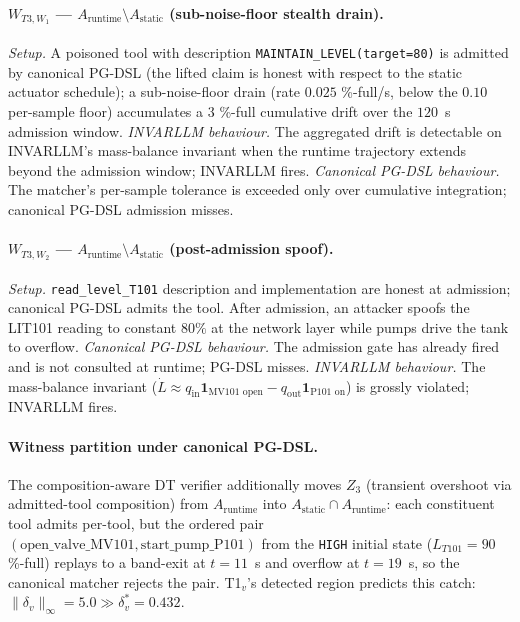 \paragraph{$W_{T3,W_1}$ --- $A_{\text{runtime}} \setminus
A_{\text{static}}$ (sub-noise-floor stealth drain).}
\textit{Setup.} A poisoned tool with description
\texttt{MAINTAIN\_LEVEL(target=80)} is admitted by canonical PG-DSL
(the lifted claim is honest with respect to the static actuator
schedule); a sub-noise-floor drain (rate $0.025$ \%-full/s, below
the $0.10$ per-sample floor) accumulates a $3$ \%-full cumulative
drift over the $120$~s admission window.
\textit{INVARLLM behaviour.} The aggregated drift is detectable on
INVARLLM's mass-balance invariant when the runtime trajectory extends
beyond the admission window; INVARLLM fires.
\textit{Canonical PG-DSL behaviour.} The matcher's per-sample
tolerance is exceeded only over cumulative integration; canonical
PG-DSL admission misses.

\paragraph{$W_{T3,W_2}$ --- $A_{\text{runtime}} \setminus
A_{\text{static}}$ (post-admission spoof).}
\textit{Setup.} \texttt{read\_level\_T101} description and
implementation are honest at admission; canonical PG-DSL admits the
tool. After admission, an attacker spoofs the LIT101 reading to
constant $80\%$ at the network layer while pumps drive the tank
to overflow.
\textit{Canonical PG-DSL behaviour.} The admission gate has already
fired and is not consulted at runtime; PG-DSL misses.
\textit{INVARLLM behaviour.} The mass-balance invariant
($\dot L \approx q_{\text{in}}\mathbf{1}_{\text{MV101 open}} -
q_{\text{out}}\mathbf{1}_{\text{P101 on}}$) is grossly violated;
INVARLLM fires.

\paragraph{Witness partition under canonical PG-DSL.}
The composition-aware DT verifier additionally moves $Z_3$
(transient overshoot via admitted-tool composition) from
$A_{\text{runtime}}$ into $A_{\text{static}} \cap A_{\text{runtime}}$:
each constituent tool admits per-tool, but the ordered pair
$(\text{open\_valve\_MV101}, \text{start\_pump\_P101})$ from the
\texttt{HIGH} initial state ($L_{T101} = 90$ \%-full) replays to a
band-exit at $t = 11$~s and overflow at $t = 19$~s, so the canonical
matcher rejects the pair. T1${}_v$'s detected region predicts this
catch: $\|\delta_v\|_\infty = 5.0 \gg \delta^{*}_v = 0.432$.

